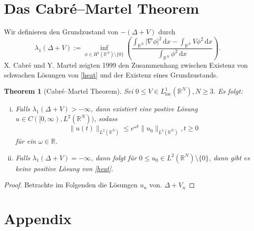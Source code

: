 \documentclass[11pt]{article}
\newtheorem{thm}{Theorem}
\theoremstyle{break}
\begin{document}
\section{Das Cabr\'e--Martel Theorem}

Wir definieren den Grundzustand von $-(\Delta +V)$ durch
\begin{equation}
\lambda_1(\Delta + V):= \inf_{\phi \in H^1(\mathbb R^N)\setminus \{0\}} \left ( \frac{\int_{\mathbb R^N} |\nabla \phi|^2\, \mathrm dx - \int_{\mathbb R^N} V\phi^2\, \mathrm dx}{\int_{\mathbb R^N} \phi^2\, \mathrm dx} \right ).
\end{equation}
X. Cabr\'e und Y. Martel zeigten 1999 den Zusammenhang zwischen Existenz von schwachen L\"osungen von \eqref{heat} und der Existenz eines Grundzustands. 
\begin{thm}[Cabr\'e--Martel Theorem]
Sei $0\le V\in L^1_{\text{loc}}(\mathbb R^N), N\ge 3$.  Es folgt:
\begin{enumerate}[(i)]
\item Falls $\lambda_1(\Delta + V) > -\infty$, dann existiert eine postive Lösung $u\in C([0,\infty), L^2(\mathbb R^N))$, sodass
\begin{equation}
\|u(t)\|_{L^2(\mathbb R^N)} \le e^{\omega t} \|u_0\|_{L^2(\mathbb R^N)}, t\ge 0
\end{equation}
für ein $\omega\in \mathbb R$.
\item Falls $\lambda_1(\Delta + V)=-\infty$, dann folgt für $0\le u_0 \in L^2(\mathbb R^N)\setminus\{0\}$, dann gibt es keine positive Lösung von \eqref{heat}.
\end{enumerate}
\end{thm}
\begin{proof}
Betrachte im Folgenden die Lösungen $u_n$ von.  $\Delta + V_n$ 
\end{proof}
\appendix
\section{Appendix}
\end{document}

